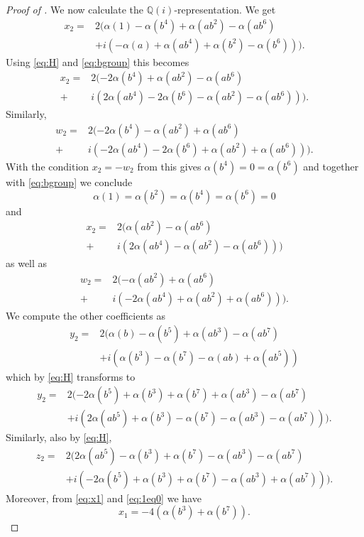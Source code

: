 \documentclass[a4paper,10pt]{amsart}
\theoremstyle{definition}
\theoremstyle{remark}
\begin{document}
\begin{proof}[Proof of ]
We now calculate the $\mathbb{Q}(i)$-representation. We get
\begin{align*}
x_2 = & 2(\alpha(1) - \alpha(b^4) + \alpha(ab^2) - \alpha(ab^6) \\
& + i(-\alpha(a) + \alpha(ab^4) + \alpha(b^2) - \alpha(b^6))).
\end{align*}
Using \eqref{eq:H} and \eqref{eq:bgroup} this becomes
\begin{align*}
x_2 = & 2(-2\alpha(b^4) + \alpha(ab^2) - \alpha(ab^6)  \\
+ & i(2\alpha(ab^4) - 2\alpha(b^6) - \alpha(ab^2) - \alpha(ab^6))).
\end{align*}
Similarly,
\begin{align*}
w_2 = & 2(-2\alpha(b^4) - \alpha(ab^2) + \alpha(ab^6)  \\
+ & i(-2\alpha(ab^4) - 2\alpha(b^6) + \alpha(ab^2) + \alpha(ab^6))).
\end{align*}
With the condition $x_2 = -w_2$ from  this gives $\alpha(b^4) = 0 = \alpha(b^6)$ and together with \eqref{eq:bgroup} we conclude
\begin{equation}\label{eq:1eq0}
\alpha(1) = \alpha(b^2) = \alpha(b^4) = \alpha(b^6) = 0
\end{equation}
and
\begin{align}
x_2 = & 2(\alpha(ab^2) - \alpha(ab^6) \label{eq:x2}  \\
+ & i(2\alpha(ab^4)- \alpha(ab^2) - \alpha(ab^6))) \nonumber
\end{align}
as well as
\begin{align}
w_2 = & 2( - \alpha(ab^2) + \alpha(ab^6) \label{w2}  \\
+ & i(-2\alpha(ab^4) + \alpha(ab^2) + \alpha(ab^6))). \nonumber
\end{align}
We compute the other coefficients as
\begin{align*}
y_2 = & 2(\alpha(b) - \alpha(b^5) + \alpha(ab^3) - \alpha(ab^7) \\
& + i(\alpha(b^3) - \alpha(b^7) - \alpha(ab) + \alpha(ab^5))
\end{align*}
which by \eqref{eq:H} transforms to
\begin{align}
y_2 = & 2(-2\alpha(b^5) + \alpha(b^3) + \alpha(b^7) + \alpha(ab^3) - \alpha(ab^7) \label{eq:y2} \\
& + i(2\alpha(ab^5) + \alpha(b^3) - \alpha(b^7) -\alpha(ab^3) -\alpha(ab^7) )). \nonumber
\end{align}
Similarly, also by \eqref{eq:H},
\begin{align}
z_2 = & 2(2\alpha(ab^5) - \alpha(b^3) + \alpha(b^7) - \alpha(ab^3) - \alpha(ab^7) \label{eq:z2} \\
& + i(-2\alpha(b^5) + \alpha(b^3)  + \alpha(b^7) - \alpha(ab^3) + \alpha(ab^7) )). \nonumber
\end{align}
Moreover, from \eqref{eq:x1} and \eqref{eq:1eq0} we have
\begin{equation}\label{eq:x1new}
x_1 = -4(\alpha(b^3)+\alpha(b^7)).
\end{equation} 


\end{proof}
\end{document}
